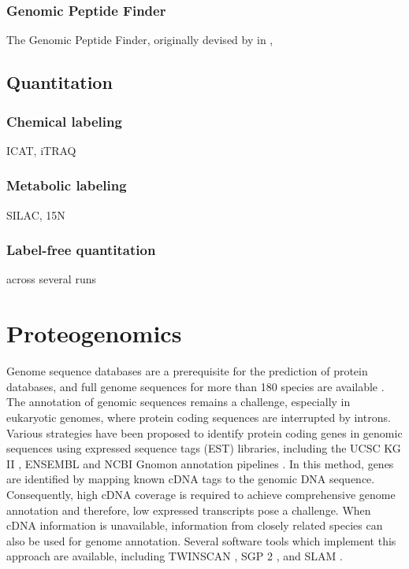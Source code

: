 \subsubsection{Genomic Peptide Finder}

The Genomic Peptide Finder, originally devised by \citeauthor{Allmer2004} in
\citeyear{Allmer2004}, 

\subsection{Quantitation}

\subsubsection{Chemical labeling}
 
\begin{todo}
ICAT, iTRAQ
\end{todo}

\subsubsection{Metabolic labeling}

\begin{todo}
SILAC, 15N
\end{todo}

\subsubsection{Label-free quantitation}

\begin{todo}
across several runs
\end{todo}

\section{Proteogenomics}
\label{proteogenomics}

Genome sequence databases are a prerequisite for the prediction of protein 
databases, and full genome sequences for more than 180 species are available
\citep{Yates2009}.
The annotation of genomic sequences remains a challenge, especially in
eukaryotic genomes, where protein coding sequences are interrupted by
introns.
Various strategies have been proposed to identify protein coding genes in
genomic sequences using expressed sequence tags (EST) libraries, 
including the UCSC KG II \citep{Karolchik2003}, ENSEMBL \citep{Hubbard2005} 
and NCBI Gnomon annotation pipelines \citep{Maglott2005}.
In this method, genes are identified by mapping known cDNA tags to the
genomic DNA sequence.
Consequently, high cDNA coverage is required to achieve comprehensive
genome annotation and therefore, low expressed transcripts pose a challenge.
When cDNA information is unavailable, information from closely related
species can also be used for genome annotation.
Several software tools which implement this approach are available,
including TWINSCAN \citep{Korf2001}, SGP 2 \citep{Parra2003}, and 
SLAM \citep{Cawley2003}.

